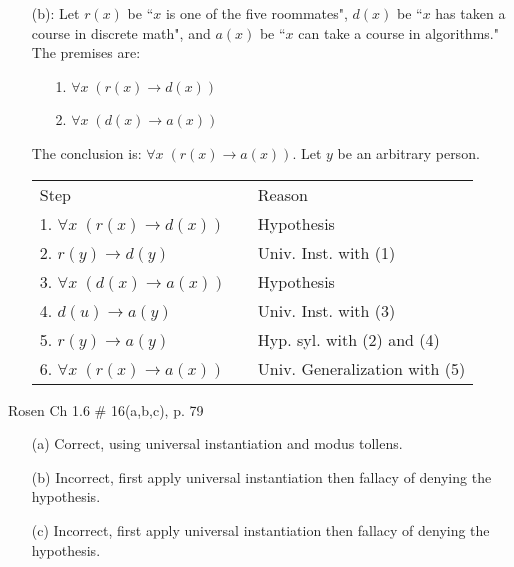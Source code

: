\documentclass[12pt,addpoints]{exam}
\begin{document}
\begin{questions}
\begin{solution}
\begin{itemize}[itemsep=0pt,parsep=0pt,topsep=0pt,partopsep=0pt]
    \item[(b):] Let $r(x)$ be ``$x$ is one of the five roommates", $d(x)$ be ``$x$ has taken a course in discrete math", and $a(x)$ be ``$x$ can take a course in algorithms." The premises are:
    \begin{itemize}[itemsep=0pt,parsep=0pt,topsep=0pt,partopsep=0pt]
        \item[1.] $\forall x\;(r(x) \rightarrow d(x))$
        \item[2.] $\forall x\;(d(x) \rightarrow a(x))$
    \end{itemize}
    The conclusion is: $\forall x\;(r(x) \rightarrow a(x))$.  Let $y$ be an arbitrary person.

    \smallskip
    \begin{tabular}{lll}
        Step        & \hspace{0.2in} & Reason \\
        1. $\forall x\;(r(x) \rightarrow d(x))$     &   & Hypothesis \\
        2. $r(y) \rightarrow d(y)$                  & & Univ. Inst. with (1) \\
        3. $\forall x\; (d(x) \rightarrow a(x))$    &   & Hypothesis \\
        4. $d(u) \rightarrow a(y)$                  &   & Univ. Inst. with (3) \\
        5. $r(y) \rightarrow a(y)$                  &   & Hyp. syl. with (2) and (4) \\
        6. $\forall x\;(r(x) \rightarrow a(x))$     &   & Univ. Generalization with (5) \\
    \end{tabular}
    \end{itemize}
\end{solution}


\question Rosen Ch 1.6 \# 16(a,b,c), p. 79
    \ifprintanswers
        \vspace{-15pt}
    \fi
\begin{solution}
    \begin{itemize}[itemsep=0pt,parsep=0pt,topsep=0pt,partopsep=0pt]
        \item[(a)] Correct, using universal instantiation and modus tollens.
        \item[(b)] Incorrect, first apply universal instantiation then fallacy of denying the hypothesis.
        \item[(c)] Incorrect, first apply universal instantiation then fallacy of denying the hypothesis.
    \end{itemize}
\end{solution}



\end{questions}
\end{document}
